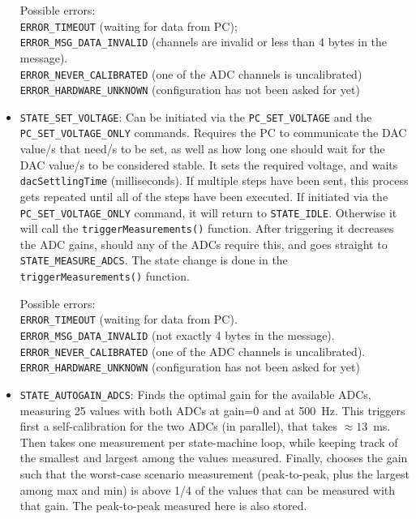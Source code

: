 \documentclass[11pt,a4paper,english]{article}
\begin{document}
\begin{itemize}
	Possible errors:\\\texttt{ERROR\_TIMEOUT} (waiting for data from PC);\\\texttt{ERROR\_MSG\_DATA\_INVALID} (channels are invalid or less than 4 bytes in the message).\\\texttt{ERROR\_NEVER\_CALIBRATED} (one of the ADC channels is uncalibrated)\\\texttt{ERROR\_HARDWARE\_UNKNOWN} (configuration has not been asked for yet)

\item \texttt{STATE\_SET\_VOLTAGE}: Can be initiated via the \texttt{PC\_SET\_VOLTAGE} and the \texttt{PC\_SET\_VOLTAGE\_ONLY} commands. Requires the PC to communicate the DAC value/s that need/s to be set, as well as how long one should wait for the DAC value/s to be considered stable. It sets the required voltage, and waits \texttt{dacSettlingTime} (milliseconds). If multiple steps have been sent, this process gets repeated until all of the steps have been executed. If initiated via the \texttt{PC\_SET\_VOLTAGE\_ONLY} command, it will return to \texttt{STATE\_IDLE}. Otherwise it will call the \texttt{triggerMeasurements()} function. After triggering it decreases the ADC gains, should any of the ADCs require this, and goes straight to \texttt{STATE\_MEASURE\_ADCS}. The state change is done in the \texttt{triggerMeasurements()} function.
	
	Possible errors:\\\texttt{ERROR\_TIMEOUT} (waiting for data from PC).\\\texttt{ERROR\_MSG\_DATA\_INVALID} (not exactly 4 bytes in the message).\\\texttt{ERROR\_NEVER\_CALIBRATED} (one of the ADC channels is uncalibrated).\\\texttt{ERROR\_HARDWARE\_UNKNOWN} (configuration has not been asked for yet)

\item \texttt{STATE\_AUTOGAIN\_ADCS}: Finds the optimal gain for the available ADCs, measuring 25 values with both ADCs at gain=0 and at 500~Hz. This triggers first a self-calibration for the two ADCs (in parallel), that takes $\approx13$~ms. Then takes one measurement per state-machine loop, while keeping track of the smallest and largest among the values measured. Finally, chooses the gain such that the worst-case scenario measurement (peak-to-peak, plus the largest among max and min) is above 1/4 of the values that can be measured with that gain. The peak-to-peak measured here is also stored.


\end{itemize}
\end{document}
